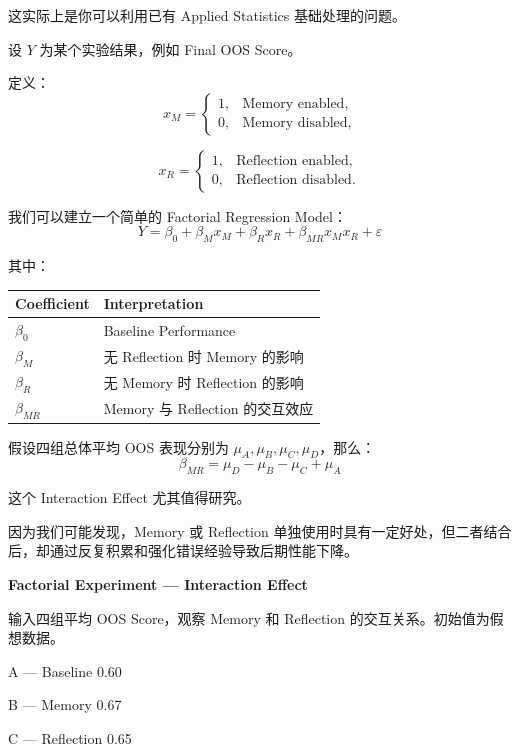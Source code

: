 这实际上是你可以利用已有 Applied Statistics 基础处理的问题。

设 \(Y\) 为某个实验结果，例如 Final OOS Score。

定义：
\[x_M=
\begin{cases}
1,&\text{Memory enabled},\\
0,&\text{Memory disabled},
\end{cases}\]

\[x_R=
\begin{cases}
1,&\text{Reflection enabled},\\
0,&\text{Reflection disabled}.
\end{cases}\]

我们可以建立一个简单的 Factorial Regression Model：
\[\boxed{
Y
=
\beta_0
+\beta_Mx_M
+\beta_Rx_R
+\beta_{MR}x_Mx_R
+\varepsilon
}\]

其中：

\begin{readertable}
\begin{longtable}[]{@{}
  >{\raggedright\arraybackslash}p{}
  >{\raggedright\arraybackslash}p{}@{}}
\toprule
Coefficient & Interpretation \\
\midrule
\endhead
\(\beta_0\) & Baseline Performance \\
\(\beta_M\) & 无 Reflection 时 Memory 的影响 \\
\(\beta_R\) & 无 Memory 时 Reflection 的影响 \\
\(\beta_{MR}\) & Memory 与 Reflection 的交互效应 \\
\bottomrule
\end{longtable}
\end{readertable}

假设四组总体平均 OOS 表现分别为 \(\mu_A,\mu_B,\mu_C,\mu_D\)，那么：
\[\boxed{
\beta_{MR}
=
\mu_D-\mu_B-\mu_C+\mu_A
}\]

这个 Interaction Effect 尤其值得研究。

因为我们可能发现，Memory 或 Reflection 单独使用时具有一定好处，但二者结合后，却通过反复积累和强化错误经验导致后期性能下降。

\textbf{Factorial Experiment --- Interaction Effect}

输入四组平均 OOS Score，观察 Memory 和 Reflection 的交互关系。初始值为假想数据。

A --- Baseline 0.60

B --- Memory 0.67

C --- Reflection 0.65

